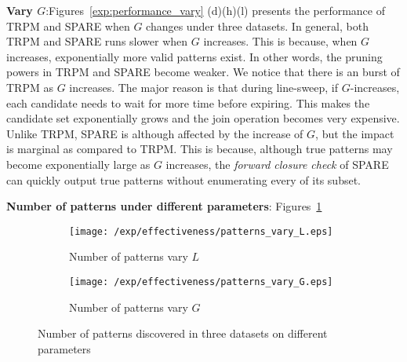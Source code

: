\textbf{Vary $G$}:Figures~\ref{exp:performance_vary} (d)(h)(l) presents the performance
of TRPM and SPARE when $G$ changes under three datasets. In general, both TRPM and SPARE
runs slower when $G$ increases. This is because, when $G$ increases, exponentially more valid patterns
exist. In other words, the pruning powers in TRPM and SPARE become weaker. We notice
that there is an burst of TRPM as $G$ increases. The major reason is that 
during line-sweep, if $G$-increases, each candidate needs to wait for more time before expiring.
This makes the candidate set exponentially grows and 
the join operation becomes very expensive.
Unlike TRPM, SPARE is although affected by the increase of $G$, 
but the impact is marginal as compared
to TRPM. This is because, although true patterns may become 
exponentially large as $G$ increases, the \emph{forward closure check} of SPARE
can quickly output true patterns without enumerating every of its subset.

\textbf{Number of patterns under different parameters}: Figures~\ref{exp:patterns_vary}
\begin{figure}[h]
\centering
    \begin{subfigure}[b]{0.23\textwidth}
        \texttt{[image: /exp/effectiveness/patterns\_vary\_L.eps]}
        \caption{Number of patterns vary $L$}
    \end{subfigure}
    \begin{subfigure}[b]{0.23\textwidth}
        \texttt{[image: /exp/effectiveness/patterns\_vary\_G.eps]}
        \caption{Number of patterns vary $G$}
    \end{subfigure}    
\caption{Number of patterns discovered in three datasets on different parameters}
\label{exp:patterns_vary}
\end{figure}


